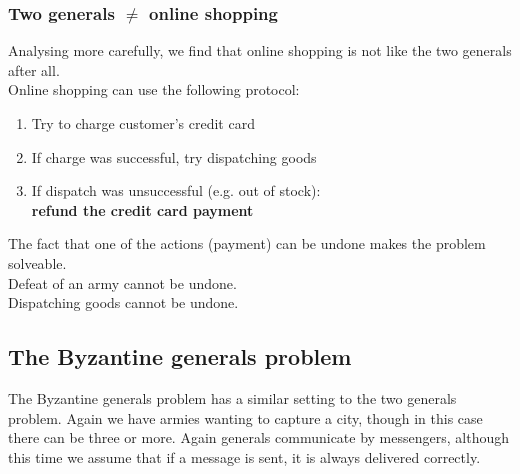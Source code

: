 \begin{frame}
    \label{s:two-generals-shopping}
    \frametitle{Two generals $\neq$ online shopping}
    Analysing more carefully, we find that online shopping is not like the two generals after all.\\[1em]
    Online shopping can use the following protocol:\pause
    \begin{enumerate}
        \item Try to charge customer's credit card\pause
        \item If charge was successful, try dispatching goods\pause
        \item If dispatch was unsuccessful (e.g. out of stock):\\\textbf{refund the credit card payment}\pause\\[1em]
    \end{enumerate}
    The fact that one of the actions (payment) can be undone makes the problem solveable.\\[1em]
    Defeat of an army cannot be undone.\\
    Dispatching goods cannot be undone.
\end{frame}
\label{l:two-generals-shopping}

\subsection{The Byzantine generals problem}\label{sec:byzantine}

The Byzantine generals problem \citep{Lamport:1982} has a similar setting to the two generals problem.
Again we have armies wanting to capture a city, though in this case there can be three or more.
Again generals communicate by messengers, although this time we assume that if a message is sent, it is always delivered correctly.

